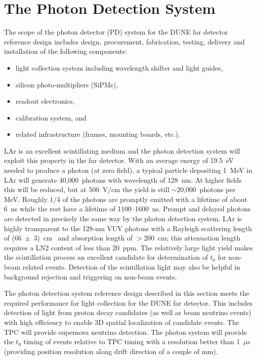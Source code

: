 \section{The Photon Detection System}
\label{sec:detectors-fd-ref-pd}

The scope of the photon detector (PD) system for the DUNE far detector
reference design includes design, procurement, fabrication,
testing, delivery and installation of the following components:
\begin{itemize}
\item light collection system including wavelength shifter and light guides,
\item silicon photo-multipliers (SiPMs),
\item readout electronics,
\item calibration system, and
\item related infrastructure (frames, mounting boards, etc.).
\end{itemize}

LAr is an excellent scintillating medium and the photon detection
system will exploit this property in the far detector.  With an
average energy of 19.5~eV needed to produce a photon (at zero field),
a typical particle depositing 1~MeV in LAr will generate
40,000~photons with wavelength of 128~nm. At higher fields this will
be reduced, but at 500~V/cm the yield is still $\sim$20,000~photons
per MeV. Roughly 1/4 of the photons are promptly emitted with a
lifetime of about 6~ns while the rest have a lifetime of
1100--1600~ns. Prompt and delayed photons are detected in
  precisely the same way by the photon detection system. LAr is
highly transparent to the 128-nm VUV photons with a Rayleigh
scattering length of (66~$\pm$~3)~cm~\cite{Rayleigh} and absorption
length of $>$200~cm; this attenuation length requires a LN2
  content of less than 20~ppm. The relatively large light yield makes
the scintillation process an excellent candidate for determination of
$t_0$ for non-beam related events. Detection of the scintillation
light may also be helpful in background rejection and triggering on
non-beam events.

The photon detection system reference design described in this section
meets the required performance for light collection for the DUNE far
detector. This includes detection of light from proton decay
candidates (as well as beam neutrino events) with high efficiency to
enable 3D spatial localization of candidate events. The TPC will
provide supernova neutrino detection. 
The photon system will provide the $t_0$ timing of
events relative to TPC timing with a resolution better than 1~$\mu$s
(providing position resolution along drift direction of a couple of mm). 

